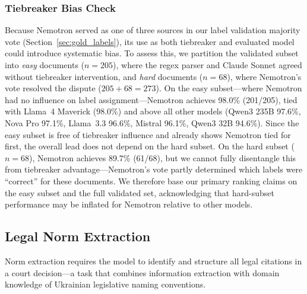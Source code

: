 \documentclass[11pt,a4paper]{article}
\begin{document}
\subsubsection{Tiebreaker Bias Check}
\label{sec:tiebreaker_bias}

Because Nemotron served as one of three sources in our label validation majority vote (Section~\ref{sec:gold_labels}), its use as both tiebreaker and evaluated model could introduce systematic bias. To assess this, we partition the validated subset into \emph{easy} documents ($n{=}205$), where the regex parser and Claude Sonnet agreed without tiebreaker intervention, and \emph{hard} documents ($n{=}68$), where Nemotron's vote resolved the dispute ($205 + 68 = 273$). On the easy subset---where Nemotron had no influence on label assignment---Nemotron achieves 98.0\% (201/205), tied with Llama~4 Maverick (98.0\%) and above all other models (Qwen3 235B 97.6\%, Nova Pro 97.1\%, Llama~3.3 96.6\%, Mistral 96.1\%, Qwen3 32B 94.6\%). Since the easy subset is free of tiebreaker influence and already shows Nemotron tied for first, the overall lead does not depend on the hard subset. On the hard subset ($n{=}68$), Nemotron achieves 89.7\% (61/68), but we cannot fully disentangle this from tiebreaker advantage---Nemotron's vote partly determined which labels were ``correct'' for these documents. We therefore base our primary ranking claims on the easy subset and the full validated set, acknowledging that hard-subset performance may be inflated for Nemotron relative to other models.

\subsection{Legal Norm Extraction}
\label{sec:results_norms}

Norm extraction requires the model to identify and structure all legal citations in a court decision---a task that combines information extraction with domain knowledge of Ukrainian legislative naming conventions.
\end{document}
